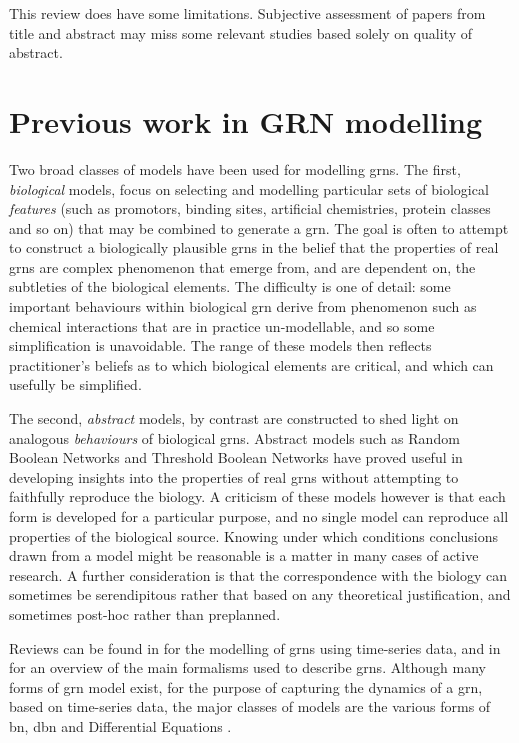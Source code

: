 This review does have some limitations. Subjective assessment of papers from title and abstract may miss some relevant studies based solely on quality of abstract.

\chapter{Previous work in GRN modelling}\label{previous-work-in-grn-modelling}

Two broad classes of models have been used for modelling \glspl{grn}. The first, \emph{biological} models, focus on selecting and modelling particular sets of biological \emph{features} (such as promotors, binding sites, artificial chemistries, protein classes and so on) that may be combined to generate a \gls{grn}. The goal is often to attempt to construct a biologically plausible \glspl{grn} in the belief that the properties of real \glspl{grn} are complex phenomenon that emerge from, and are dependent on, the subtleties of the biological elements. The difficulty is one of detail: some important behaviours within biological \gls{grn} derive from phenomenon such as chemical interactions that are in practice un-modellable, and so some simplification is unavoidable. The range of these models then reflects practitioner's beliefs as to which biological elements are critical, and which can usefully be simplified.

The second, \emph{abstract} models, by contrast are constructed to shed light on analogous \emph{behaviours} of biological \glspl{grn}. Abstract models such as Random Boolean Networks and Threshold Boolean Networks have proved useful in developing insights into the properties of real \glspl{grn} without attempting to faithfully reproduce the biology. A criticism of these models however is that each form is developed for a particular purpose, and no single model can reproduce all properties of the biological source. Knowing under which conditions conclusions drawn from a model might be reasonable is a matter in many cases of active research.  A further consideration is that the correspondence with the biology can sometimes be serendipitous rather that based on any theoretical justification, and sometimes post-hoc rather than preplanned.

Reviews can be found in \cite{Sima:2009lv} for the modelling of \glspl{grn} using time-series data, and in \cite{De-Jong:2002jv} for an overview of the main formalisms used to describe \glspl{grn}. Although many forms of \gls{grn} model exist, for the purpose of capturing the dynamics of a \gls{grn}, based on time-series data, the major classes of models are the various forms of \gls{bn}, \gls{dbn} and Differential Equations \cite{Sima:2009lv}.

